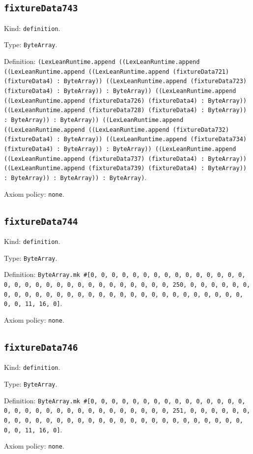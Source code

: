 \documentclass[11pt]{article}
\begin{document}
\subsection*{\texttt{fixtureData743}}
\noindent Kind: \texttt{definition}.\par
\noindent Type: \texttt{ByteArray}.\par
\noindent Definition: \texttt{(LexLeanRuntime.append ((LexLeanRuntime.append ((LexLeanRuntime.append ((LexLeanRuntime.append (fixtureData721) (fixtureData4) : ByteArray)) ((LexLeanRuntime.append (fixtureData723) (fixtureData4) : ByteArray)) : ByteArray)) ((LexLeanRuntime.append ((LexLeanRuntime.append (fixtureData726) (fixtureData4) : ByteArray)) ((LexLeanRuntime.append (fixtureData728) (fixtureData4) : ByteArray)) : ByteArray)) : ByteArray)) ((LexLeanRuntime.append ((LexLeanRuntime.append ((LexLeanRuntime.append (fixtureData732) (fixtureData4) : ByteArray)) ((LexLeanRuntime.append (fixtureData734) (fixtureData4) : ByteArray)) : ByteArray)) ((LexLeanRuntime.append ((LexLeanRuntime.append (fixtureData737) (fixtureData4) : ByteArray)) ((LexLeanRuntime.append (fixtureData739) (fixtureData4) : ByteArray)) : ByteArray)) : ByteArray)) : ByteArray)}.\par
\noindent Axiom policy: \texttt{none}.\par
\subsection*{\texttt{fixtureData744}}
\noindent Kind: \texttt{definition}.\par
\noindent Type: \texttt{ByteArray}.\par
\noindent Definition: \texttt{ByteArray.mk \#[0, 0, 0, 0, 0, 0, 0, 0, 0, 0, 0, 0, 0, 0, 0, 0, 0, 0, 0, 0, 0, 0, 0, 0, 0, 0, 0, 0, 0, 0, 0, 250, 0, 0, 0, 0, 0, 0, 0, 0, 0, 0, 0, 0, 0, 0, 0, 0, 0, 0, 0, 0, 0, 0, 0, 0, 0, 0, 0, 0, 0, 0, 0, 11, 16, 0]}.\par
\noindent Axiom policy: \texttt{none}.\par
\subsection*{\texttt{fixtureData746}}
\noindent Kind: \texttt{definition}.\par
\noindent Type: \texttt{ByteArray}.\par
\noindent Definition: \texttt{ByteArray.mk \#[0, 0, 0, 0, 0, 0, 0, 0, 0, 0, 0, 0, 0, 0, 0, 0, 0, 0, 0, 0, 0, 0, 0, 0, 0, 0, 0, 0, 0, 0, 0, 251, 0, 0, 0, 0, 0, 0, 0, 0, 0, 0, 0, 0, 0, 0, 0, 0, 0, 0, 0, 0, 0, 0, 0, 0, 0, 0, 0, 0, 0, 0, 0, 11, 16, 0]}.\par
\noindent Axiom policy: \texttt{none}.\par
\end{document}
